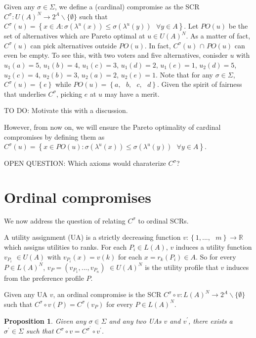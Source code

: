\documentclass[12pt,notitlepage,a4paper]{article}
\newtheorem{proposition}{Proposition}[section]
\begin{document}
Given any $\sigma \in \Sigma $, we define a (cardinal) compromise as the SCR 
$C^{\sigma }:U(A)^{N}\rightarrow 2^{A}\backslash \{\emptyset \}$ such that $%
C^{\sigma }(u)=\left\{ x\in A:\sigma (\lambda ^{u}(x))\leq \sigma (\lambda
^{u}(y))\text{ }\forall y\in A\right\} $. Let $PO(u)$ be the set of
alternatives which are Pareto optimal at $u\in U(A)^{N}$. As a matter of
fact, $C^{\sigma }(u)$ can pick alternatives outside $PO(u)$. In fact, $%
C^{\sigma }(u)$ $\cap $ $PO(u)$ can even be empty. To see this, with two
voters and five alternatives, conisder $u$ with $u_{1}(a)=5$, $u_{1}(b)=4$, $%
u_{1}(c)=3$, $u_{1}(d)=2$, $u_{1}(e)=1$, $u_{2}(d)=5$, $u_{2}(c)=4$, $%
u_{2}(b)=3$, $u_{2}(a)=2$, $u_{2}(e)=1$. Note that for any $\sigma \in
\Sigma $, $C^{\sigma }(u)=\left\{ e\right\} $ while $PO(u)=\left\{ a,\text{ }%
b,\text{ }c,\text{ }d\right\} $. Given the spirit of fairness that underlies 
$C^{\sigma }$, picking $e$ at $u$ may have a merit. 

TO DO: Motivate this with a discussion.

However, from now on, we will ensure the Pareto optimality of cardinal
compromises by defining them as $C^{\sigma }(u)=\left\{ x\in PO(u):\sigma
(\lambda ^{u}(x))\leq \sigma (\lambda ^{u}(y))\text{ }\forall y\in A\right\} 
$.

OPEN QUESTION: Which axioms would charaterize $C^{\sigma }$?

\section{Ordinal compromises}

We now address the question of relating $C^{\sigma }$ to ordinal SCRs.

A utility assignment (UA) is a strictly decreasing function $v:\left\{ 1,...,%
\text{ }m\right\} \longrightarrow 
\mathbb{R}
$ which assigns utilities to ranks. For each $P_{i}\in L(A)$, $v$ induces a
utility function $v_{P_{i}}$ $\in U(A)$ with $v_{P_{i}}(x)=v(k)$ for each $%
x=r_{k}(P_{i})\in A$. So for every $P\in L(A)^{N}$, $%
v_{P}=(v_{P_{1}},...,v_{P_{n}})$ $\in U(A)^{N}$ is the utility profile that $%
v$ induces from the preference profile $P$.

Given any UA $v$, an ordinal compromise is the SCR $C^{\sigma }\circ
v:L(A)^{N}\rightarrow 2^{A}\backslash \{\emptyset \}$ such that $C^{\sigma
}\circ v(P)=C^{\sigma }(v_{P})$ for every $P\in L(A)^{N}$.

\begin{proposition}
\label{equivalence} Given any $\sigma \in \Sigma $ and any two UAs $v$ and $%
v^{\prime }$, there exists a $\sigma ^{\prime }\in \Sigma $ such that $%
C^{\sigma }\circ v=C^{\sigma ^{\prime }}\circ v^{\prime }$.
\end{proposition}
\end{document}
